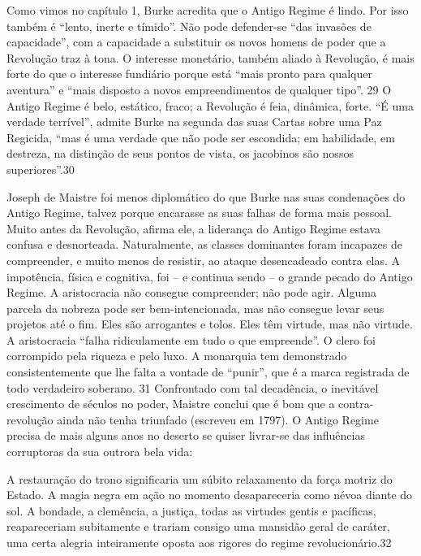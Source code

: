 \par 
Como vimos no capítulo 1, Burke acredita que o Antigo Regime é lindo. Por isso também é “lento, inerte e tímido”. Não pode defender-se “das invasões de capacidade”, com a capacidade a substituir os novos homens de poder que a Revolução traz à tona. O interesse monetário, também aliado à Revolução, é mais forte do que o interesse fundiário porque está “mais pronto para qualquer aventura” e “mais disposto a novos empreendimentos de qualquer tipo”. {\color{blue}29} O Antigo Regime é belo, estático, fraco; a Revolução é feia, dinâmica, forte. “É uma verdade terrível”, admite Burke na segunda das suas Cartas sobre uma Paz Regicida, “mas é uma verdade que não pode ser escondida; em habilidade, em destreza, na distinção de seus pontos de vista, os jacobinos são nossos superiores”.{\color{blue}30}
 \par 
Joseph de Maistre foi menos diplomático do que Burke nas suas condenações do Antigo Regime, talvez porque encarasse as suas falhas de forma mais pessoal. Muito antes da Revolução, afirma ele, a liderança do Antigo Regime estava confusa e desnorteada. Naturalmente, as classes dominantes foram incapazes de compreender, e muito menos de resistir, ao ataque desencadeado contra elas. A impotência, física e cognitiva, foi – e continua sendo – o grande pecado do Antigo Regime. A aristocracia não consegue compreender; não pode agir. Alguma parcela da nobreza pode ser bem-intencionada, mas não consegue levar seus projetos até o fim. Eles são arrogantes e tolos. Eles têm virtude, mas não virtude. A aristocracia “falha ridiculamente em tudo o que empreende”. O clero foi corrompido pela riqueza e pelo luxo. A monarquia tem demonstrado consistentemente que lhe falta a vontade de “punir”, que é a marca registrada de todo verdadeiro soberano. {\color{blue}31} Confrontado com tal decadência, o inevitável crescimento de séculos no poder, Maistre conclui que é bom que a contra-revolução ainda não tenha triunfado (escreveu em 1797). O Antigo Regime precisa de mais alguns anos no deserto se quiser livrar-se das influências corruptoras da sua outrora bela vida:
 \par 
A restauração do trono significaria um súbito relaxamento da força motriz do Estado. A magia negra em ação no momento desapareceria como névoa diante do sol. A bondade, a clemência, a justiça, todas as virtudes gentis e pacíficas, reapareceriam subitamente e trariam consigo uma mansidão geral de caráter, uma certa alegria inteiramente oposta aos rigores do regime revolucionário.{\color{blue}32}
